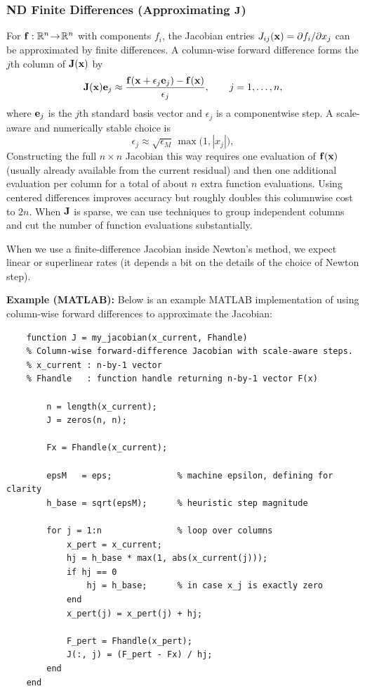 \subsubsection{ND Finite Differences (Approximating \texorpdfstring{$\mathbf{J}$}{J})}
For $\mathbf{f}:\mathbb{R}^n\!\to\!\mathbb{R}^n$ with components $f_i$, the Jacobian entries $J_{ij}(\mathbf{x})=\partial f_i/\partial x_j$ can be approximated by finite differences. A column-wise forward difference forms the $j$th column of $\mathbf{J}(\mathbf{x})$ by
\[
  \mathbf{J}(\mathbf{x})\mathbf{e}_j
  \approx
  \frac{\mathbf{f}(\mathbf{x}+\epsilon_j \mathbf{e}_j)-\mathbf{f}(\mathbf{x})}{\epsilon_j},
  \qquad j=1,\ldots,n,
\]
where $\mathbf{e}_j$ is the $j$th standard basis vector and $\epsilon_j$ is a componentwise step. A scale-aware and numerically stable choice is
\[
  \epsilon_j \approx \sqrt{\epsilon_M}\,\max\!\bigl(1,|x_j|\bigr),
\]
Constructing the full $n\times n$ Jacobian this way requires one evaluation of $\mathbf{f}(\mathbf{x})$ (usually already available from the current residual) and then one additional evaluation per column for a total of about $n$ extra function evaluations. Using centered differences improves accuracy but roughly doubles this columnwise cost to $2n$. When $\mathbf{J}$ is sparse, we can use techniques to group independent columns and cut the number of function evaluations substantially.

When we use a finite-difference Jacobian inside Newton's method, we expect linear or superlinear rates (it depends a bit on the details of the choice of Newton step).

\begin{exampleBox}
    \textbf{Example (MATLAB):} Below is an example MATLAB implementation of using column-wise forward differences to approximate the Jacobian:
    \begin{verbatim}
    function J = my_jacobian(x_current, Fhandle)
    % Column-wise forward-difference Jacobian with scale-aware steps.
    % x_current : n-by-1 vector
    % Fhandle   : function handle returning n-by-1 vector F(x)

        n = length(x_current);
        J = zeros(n, n);

        Fx = Fhandle(x_current);

        epsM   = eps;             % machine epsilon, defining for clarity
        h_base = sqrt(epsM);      % heuristic step magnitude

        for j = 1:n               % loop over columns
            x_pert = x_current;
            hj = h_base * max(1, abs(x_current(j)));
            if hj == 0
                hj = h_base;      % in case x_j is exactly zero
            end
            x_pert(j) = x_pert(j) + hj;

            F_pert = Fhandle(x_pert);
            J(:, j) = (F_pert - Fx) / hj;
        end
    end
    \end{verbatim}
\end{exampleBox}

